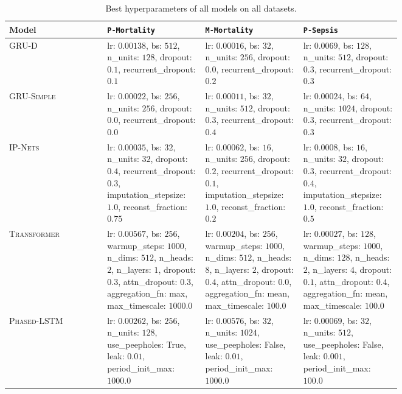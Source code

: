 \documentclass{article}
\newcommand{\dataset}[1]{\texttt{#1}}
\newcommand{\method}[1]{\textsc{#1}}
\begin{document}
\begin{table*}
    \caption{Best hyperparameters of all models on all datasets.} \label{tab:selected hyperparameters}
    \begin{tabularx}{\linewidth}{Xp{0.25\linewidth}p{0.25\linewidth}p{0.25\linewidth}}
\toprule
\textbf{Model} & \dataset{P-Mortality} & \dataset{M-Mortality} & \dataset{P-Sepsis} \\
\midrule
\method{GRU-D} & 
    lr: $0.00138$, bs: $512$, n\_units: $128$, dropout: $0.1$, recurrent\_dropout: $0.1$ &
    lr: $0.00016$, bs: $32$, n\_units: $256$, dropout: $0.0$, recurrent\_dropout: $0.2$ &
    lr: $0.0069$, bs: $128$, n\_units: $512$, dropout: $0.3$, recurrent\_dropout: $0.3$ \\
\midrule
\method{GRU-Simple} &
    lr: $0.00022$, bs: $256$, n\_units: $256$, dropout: $0.0$, recurrent\_dropout: $0.0$ &
    lr: $0.00011$, bs: $32$, n\_units: $512$, dropout: $0.3$, recurrent\_dropout: $0.4$ &
    lr: $0.00024$, bs: $64$, n\_units: $1024$, dropout: $0.3$, recurrent\_dropout: $0.3$ \\
\midrule
\method{IP-Nets}    &
    lr: $0.00035$, bs: $32$, n\_units: $32$, dropout: $0.4$, recurrent\_dropout: $0.3$, imputation\_stepsize: $1.0$, reconst\_fraction: $0.75$ &
    lr: $0.00062$, bs: $16$, n\_units: $256$, dropout: $0.2$, recurrent\_dropout: $0.1$, imputation\_stepsize: $1.0$, reconst\_fraction: $0.2$ &
    lr: $0.0008$, bs: $16$, n\_units: $32$, dropout: $0.3$, recurrent\_dropout: $0.4$, imputation\_stepsize: $1.0$, reconst\_fraction: $0.5$ \\
\midrule
\method{Transformer} & 
    lr: $0.00567$, bs: $256$, warmup\_steps: $1000$, n\_dims: $512$, n\_heads: $2$, n\_layers: $1$, dropout: $0.3$, attn\_dropout: $0.3$, aggregation\_fn: max, max\_timescale: $1000.0$ &
    lr: $0.00204$, bs: $256$, warmup\_steps: $1000$, n\_dims: $512$, n\_heads: $8$, n\_layers: $2$, dropout: $0.4$, attn\_dropout: $0.0$, aggregation\_fn: mean, max\_timescale: $100.0$ &
    lr: $0.00027$, bs: $128$, warmup\_steps: $1000$, n\_dims: $128$, n\_heads: $2$, n\_layers: $4$, dropout: $0.1$, attn\_dropout: $0.4$, aggregation\_fn: mean, max\_timescale: $100.0$ \\
\midrule
\method{Phased-LSTM} &
    lr: $0.00262$, bs: $256$, n\_units: $128$, use\_peepholes: True, leak: $0.01$, period\_init\_max: $1000.0$ &
    lr: $0.00576$, bs: $32$, n\_units: $1024$, use\_peepholes: False, leak: $0.01$, period\_init\_max: $1000.0$ &
    lr: $0.00069$, bs: $32$, n\_units: $512$, use\_peepholes: False, leak: $0.001$, period\_init\_max: $100.0$ \\

\end{tabularx}
\end{table*}
\end{document}

